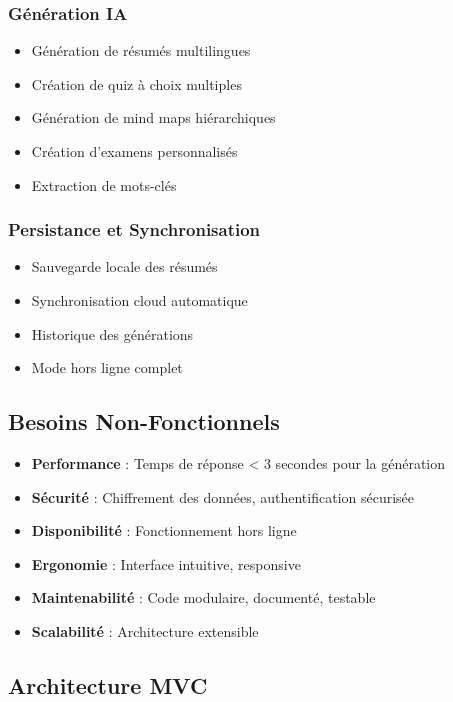 \documentclass[12pt,a4paper]{report}
\begin{document}
\subsubsection{Génération IA}
\begin{itemize}
    \item Génération de résumés multilingues
    \item Création de quiz à choix multiples
    \item Génération de mind maps hiérarchiques
    \item Création d'examens personnalisés
    \item Extraction de mots-clés
\end{itemize}

\subsubsection{Persistance et Synchronisation}
\begin{itemize}
    \item Sauvegarde locale des résumés
    \item Synchronisation cloud automatique
    \item Historique des générations
    \item Mode hors ligne complet
\end{itemize}

\subsection{Besoins Non-Fonctionnels}

\begin{itemize}
    \item \textbf{Performance} : Temps de réponse < 3 secondes pour la génération
    \item \textbf{Sécurité} : Chiffrement des données, authentification sécurisée
    \item \textbf{Disponibilité} : Fonctionnement hors ligne
    \item \textbf{Ergonomie} : Interface intuitive, responsive
    \item \textbf{Maintenabilité} : Code modulaire, documenté, testable
    \item \textbf{Scalabilité} : Architecture extensible
\end{itemize}

\subsection{Architecture MVC}
\end{document}
